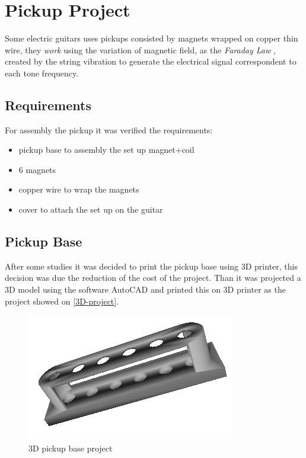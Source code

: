 \chapter{Pickup Project}
\label{pickup-project}

Some electric guitars uses pickups consisted by magnets wrapped on copper thin wire, they
\textit{work} \cite{pickup-work} using the variation of magnetic field, as the \textit{Faraday Law}
\cite{faraday-law}, created by the string vibration to generate the electrical signal correspondent
to each tone frequency.

\section{Requirements}
For assembly the pickup it was verified the requirements:

{\begin{itemize}
  \item pickup base to assembly the set up magnet+coil
  \item 6 magnets
  \item copper wire to wrap the magnets
  \item cover to attach the set up on the guitar
\end{itemize}}

\section{Pickup Base}
After some studies it was decided to print the pickup base using 3D printer, this
decision was due the reduction of the cost of the project. Than it was projected a 3D
model using the software AutoCAD and printed this on 3D printer as the project showed
on \autoref{3D-project}.

\begin{figure}[!htpb]
\centering
\caption{3D pickup base project}
\label{3D-project}
\includegraphics[scale=0.5]{images/pickup}
\end{figure}

